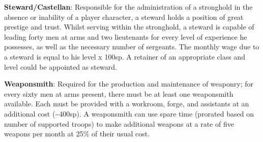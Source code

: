 \documentclass{article}
\begin{document}
\begin{multicols}{2}
\textbf{Steward/Castellan}: Responsible for the administration of a
stronghold in the absence or inability of a player character, a steward
holds a position of great prestige and trust. Whilst serving within the
stronghold, a steward is capable of leading forty men at arms and two
lieutenants for every level of experience he possesses, as well as the
necessary number of sergeants. The monthly wage due to a steward is
equal to his level x 100sp. A retainer of an appropriate class and level
could be appointed as steward.

\textbf{Weaponsmith}: Required for the production and maintenance of
weaponry; for every sixty men at arms present, there must be at least
one weaponsmith available. Each must be provided with a workroom, forge,
and assistants at an additional cost (\textasciitilde400sp). A
weaponsmith can use spare time (prorated based on number of supported
troops) to make additional weapons at a rate of five weapons per month
at 25\% of their usual cost.

\end{multicols}
\end{document}
